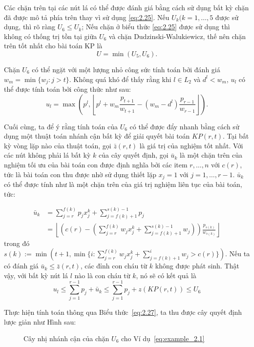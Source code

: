 Các chặn trên tại các nút lá có thể được đánh giá bằng cách sử dụng bất kỳ chặn đã được mô tả phía trên thay vì sử dụng \eqref{eq:2.25}. Nếu $U_k (k = 1, \dots, 5$ được sử dụng, thì rõ ràng $U_6 \leq U_k$; Nếu chặn ở biểu thức \eqref{eq:2.25} được sử dụng thì không có thống trị tồn tại giữa $U_6$ và chặn Dudzinski-Walukiewicz, thế nên chặn trên tốt nhất cho bài toán KP là 
\begin{equation*}
    U = \min(U_5, U_6).
\end{equation*}

Chặn $U_6$ có thể ngặt với một lượng nhỏ công sức tính toán bởi đánh giá $w_m = \min\{w_j : j > t\}$. Không quá khó để thấy rằng khi $l \in L_2$ và $d^l < w_m$, $u_l$ có thể được tính toán bởi công thức như sau:
\begin{equation}
    \label{eq:2.26}
    u_l = \max\left(p^l, \left \lfloor p^l + w_m\frac{p_{t+1}}{w_{t+1}} - (w_m - d^l)\frac{p_{r-1}}{w_{r-1}}\right \rfloor\right).
\end{equation}

Cuối cùng, ta để ý rằng tính toán của $U_6$ có thể được đẩy nhanh bằng cách sử dụng một thuật toán nhánh cận bất kỳ để giải quyết bài toán $KP(r, t)$. Tại bất kỳ vòng lặp nào của thuật toán, gọi $\bar{z}(r, t)$ là giá trị của nghiệm tốt nhất. Với các nút không phải lá bất kỳ $k$ của cây quyết định, gọi $\bar{u}_k$ là một chặn trên của nghiệm tối ưu của bài toán con được định nghĩa bởi các item $r, \dots, n$ với  $c(r)$, tức là bài toán con thu được nhờ sử dụng thiết lặp $x_j = 1$ với $j = 1, \dots, r - 1$. $\bar{u}_k$ có thể được tính như là một chặn trên của giá trị nghiệm liên tục của bài toán, tức:

\begin{align}
    \label{eq:2.27}
    \bar{u}_k & = \sum_{j = r}^{f(k)}p_jx_j^k + \sum_{j = f(k) + 1}^{s(k) - 1}p_j \\
    &= \left \lfloor \left(c(r) - \left(\sum_{j = r}^{f(k)}w_jx_j^k + \sum_{j = f(k) + 1}^{s(k) - 1}w_j\right)\right) \frac{p_{s(k)}}{w_{s(k)}} \right \rfloor
\end{align}
trong đó $s(k) := \min(t + 1, \min\{i : \sum_{j = r}^{f(k)}w_jx_j^k + \sum_{j = f(k) + 1}^{i}w_j > c(r)\})$. Nếu ta có đánh giá $\bar{u}_k \leq \bar{z}(r, t)$, các đỉnh con cháu từ $k$ không được phát sinh. Thật vậy, với bất kỳ nút lá $l$ nào là con cháu từ $k$, nó sẽ có kết quả là 
\begin{equation*}
    u_l \leq \sum_{j=1}^{r - 1}p_j + \bar{u}_k \leq \sum_{j = 1}^{r - 1}p_j + z(KP(r, t)) \leq U_6
\end{equation*}

\begin{example}
    Thực hiện tính toán thông qua Biểu thức~\ref{eq:2.27}, ta thu được cây quyết định lược giản như Hình sau:
    \begin{figure}[H]
        \centering
        
        \caption{Cây nhị nhánh cận của chặn $U_6$ cho Ví dụ~\ref{eq:example_2.1}}
        \label{fig:rbanhbound_u6_ex2.1}
    \end{figure}
\end{example}


